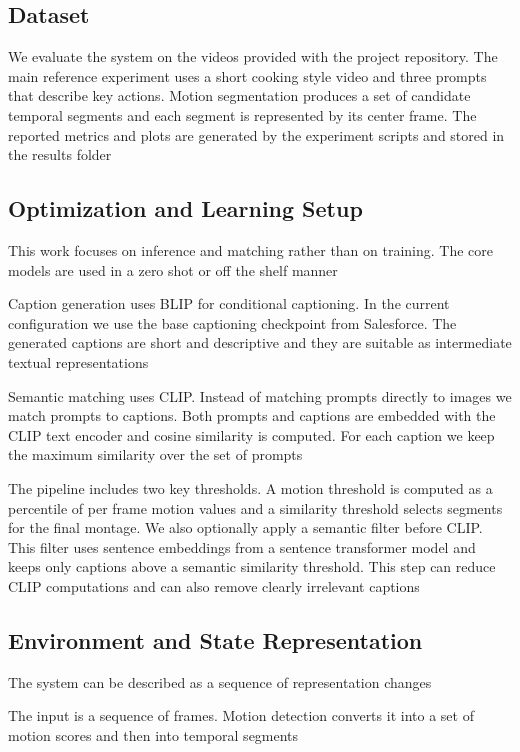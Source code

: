 \documentclass[conference,compsoc]{IEEEtran}
\begin{document}
\subsection{Dataset}
We evaluate the system on the videos provided with the project repository. The main reference experiment uses a short cooking style video and three prompts that describe key actions. Motion segmentation produces a set of candidate temporal segments and each segment is represented by its center frame. The reported metrics and plots are generated by the experiment scripts and stored in the results folder

\subsection{Optimization and Learning Setup}
This work focuses on inference and matching rather than on training. The core models are used in a zero shot or off the shelf manner

Caption generation uses BLIP for conditional captioning. In the current configuration we use the base captioning checkpoint from Salesforce. The generated captions are short and descriptive and they are suitable as intermediate textual representations

Semantic matching uses CLIP. Instead of matching prompts directly to images we match prompts to captions. Both prompts and captions are embedded with the CLIP text encoder and cosine similarity is computed. For each caption we keep the maximum similarity over the set of prompts

The pipeline includes two key thresholds. A motion threshold is computed as a percentile of per frame motion values and a similarity threshold selects segments for the final montage. We also optionally apply a semantic filter before CLIP. This filter uses sentence embeddings from a sentence transformer model and keeps only captions above a semantic similarity threshold. This step can reduce CLIP computations and can also remove clearly irrelevant captions

\subsection{Environment and State Representation}
The system can be described as a sequence of representation changes

The input is a sequence of frames. Motion detection converts it into a set of motion scores and then into temporal segments
\end{document}
